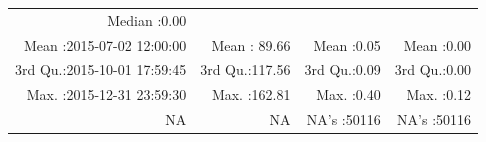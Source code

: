 \documentclass[
  10pt,
  a4paper,oneside]{article}
\begin{document}
\begin{longtable}[]{@{}rrrr@{}}
\begin{minipage}[t]{0.17\columnwidth}
Median :0.00\strut
\end{minipage}\tabularnewline
\begin{minipage}[t]{0.34\columnwidth}\raggedleft
Mean :2015-07-02 12:00:00\strut
\end{minipage} & \begin{minipage}[t]{0.20\columnwidth}\raggedleft
Mean : 89.66\strut
\end{minipage} & \begin{minipage}[t]{0.17\columnwidth}\raggedleft
Mean :0.05\strut
\end{minipage} & \begin{minipage}[t]{0.17\columnwidth}\raggedleft
Mean :0.00\strut
\end{minipage}\tabularnewline
\begin{minipage}[t]{0.34\columnwidth}\raggedleft
3rd Qu.:2015-10-01 17:59:45\strut
\end{minipage} & \begin{minipage}[t]{0.20\columnwidth}\raggedleft
3rd Qu.:117.56\strut
\end{minipage} & \begin{minipage}[t]{0.17\columnwidth}\raggedleft
3rd Qu.:0.09\strut
\end{minipage} & \begin{minipage}[t]{0.17\columnwidth}\raggedleft
3rd Qu.:0.00\strut
\end{minipage}\tabularnewline
\begin{minipage}[t]{0.34\columnwidth}\raggedleft
Max. :2015-12-31 23:59:30\strut
\end{minipage} & \begin{minipage}[t]{0.20\columnwidth}\raggedleft
Max. :162.81\strut
\end{minipage} & \begin{minipage}[t]{0.17\columnwidth}\raggedleft
Max. :0.40\strut
\end{minipage} & \begin{minipage}[t]{0.17\columnwidth}\raggedleft
Max. :0.12\strut
\end{minipage}\tabularnewline
\begin{minipage}[t]{0.34\columnwidth}\raggedleft
NA\strut
\end{minipage} & \begin{minipage}[t]{0.20\columnwidth}\raggedleft
NA\strut
\end{minipage} & \begin{minipage}[t]{0.17\columnwidth}\raggedleft
NA's :50116\strut
\end{minipage} & \begin{minipage}[t]{0.17\columnwidth}\raggedleft
NA's :50116\strut
\end{minipage}\tabularnewline
\bottomrule
\end{longtable}
\end{document}
